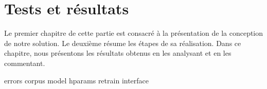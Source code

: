 \chapter{Tests et résultats}%
\label{chap.results}

Le premier chapitre de cette partie est consacré à la présentation de la conception de notre solution.
Le deuxième résume les étapes de sa réalisation.
Dans ce chapitre, nous présentons les résultats obtenus en les analysant et en les commentant.

{errors}
{corpus}
{model}
{hparams}
{retrain}
{interface}